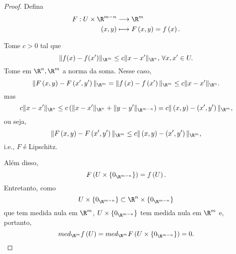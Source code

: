 \begin{proof}
    Defina 
    \begin{align*}
        F: U\times \R^{m-n} &\longrightarrow \R^{m} \\
        \left( x,y \right)  &\longmapsto F\left( x,y \right) = f\left( x \right) 
    .\end{align*}

    Tome $c> 0$ tal que \[
	\|f(x) - f(x')\|_{\R^{m}}\le c \|x-x'\|_{\R^{n}} \text{, }\forall x,x' \in U
    .\] Tome em $\R^{n},\R^{m}$ a norma da soma. Nesse caso, \[
    \|F\left( x,y \right) - F\left( x',y' \right) \|_{\R^{m}} = \|f\left( x \right) - f\left( x' \right) \|_{\R^{m}} \le c\|x-x'\|_{\R^{n}}
    .\] mas \[
    c\|x-x'\|_{\R^{n}} \le c\left( \|x-x'\|_{\R^{n}}+\|y-y'\|_{\R^{m-n}} \right) = c\|\left( x,y \right) -\left( x',y' \right) \|_{\R^{m}}
    ,\] ou seja, \[
    \|F\left( x,y \right) - F\left( x',y' \right) \|_{\R^{m}} \le c\|\left( x,y \right) -\left( x',y' \right) \|_{\R^{m}}
    ,\] i.e., $F$ é Lipschitz.

    Além disso, \[
    F\left( U\times \left\{ 0_{\R^{m-n}} \right\}  \right) = f\left( U \right) 
    .\] Entretanto, como \[
    U\times \left\{ 0_{\R^{m-n}} \right\} \subset \R^{n}\times \left\{ 0_{\R^{m-n}} \right\}
    \] que tem medida nula em $\R^{m}$, $U\times \left\{ 0_{\R^{m-n}} \right\}$ tem medida nula em $\R^{m}$ e, portanto, \[
     med_{\R^{m}}f\left( U \right)  = med_{\R^{m}}F\left( U\times \left\{ 0_{\R^{m-n}} \right\} \right) = 0
    .\] 
\end{proof}

